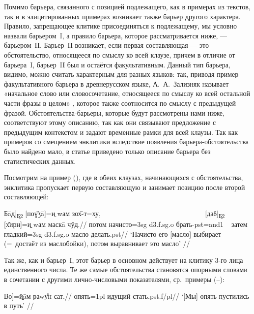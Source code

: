 Помимо барьера, связанного с позицией подлежащего, как в примерах из текстов, так и в элицитированных примерах возникает также барьер другого характера. Правило, запрещающее клитике присоединяться к подлежащему, мы условно назвали барьером~I, а правило барьера, которое рассматривается ниже, — барьером~II. Барьер~II возникает, если первая составляющая — это обстоятельство, относящееся по смыслу ко всей клаузе, причем в отличие от барьера~I, барьер~II был и остаётся факультативным. Данный тип барьера, видимо, можно считать характерным для разных языков: так, приводя пример факультативного барьера в древнерусском языке, А.~А.~Зализняк называет «начальное слово или словосочетание, относящееся по смыслу ко всей остальной части фразы в целом» \parencite[56]{zalizniak2008}, которое также соотносится по смыслу с предыдущей фразой. Обстоятельства-барьеры, которые будут рассмотрены нами ниже, соответствуют этому описанию, так как они связывают предложение с предыдущим контекстом и задают временные рамки для всей клаузы. Так как примеров со смещением энклитики вследствие появления барьера-обстоятельства было найдено мало, в статье приведено только описание барьера без статистических данных.

Посмотрим на пример (), где в обеих клаузах, начинающихся с обстоятельства, энклитика пропускает первую составляющую и занимает позицию после второй составляющей:

\begingl
\gla {[}Бāд{]}\textsubscript{\b{Б2}} {[}поɣ̌ӡā{]}=\b{и} wам зох̌-т=ху, ~~~~~~~~~~~~~~~~~~~~~~~~~~~~~ {[}даδ{]}\textsubscript{\b{Б2}} {[}х̌ирн{]}=\b{и} wам маскā чӯд.//
\glc потом начисто={\sc 3sg} {\sc d3.f.sg.o} брать-{\sc pst=and1} ~ затем гладкий={\sc 3sg} {\sc d3.f.sg.o} масло делать.{\sc pst}//
\glft ‘Начисто его [масло] выбирает (=~достаёт из маслобойки), потом выравнивает это масло’ //
\endgl \xe

Так же, как и барьер~I, этот барьер в основном действует на клитику 3-го лица единственного числа. Те же самые обстоятельства становятся опорными словами в сочетании с другими лично-числовыми показателями, ср.~примеры (–):

\begingl
\gla {[}Во{]}=\b{йāм} раwу̊н сат.//
\glc опять={\sc 1pl} идущий стать.{\sc pst.f/pl}//
\glft ‘[Мы] опять пустились в путь’ //
\endgl \xe

